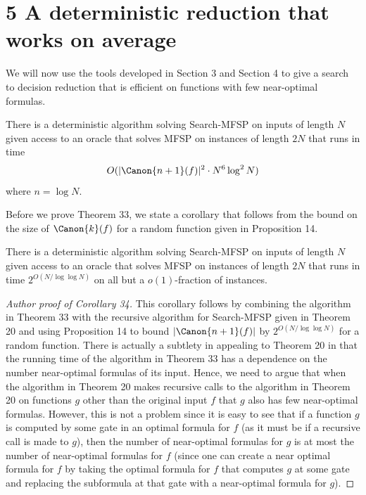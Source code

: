 \section*{5 A deterministic reduction that works on average}
We will now use the tools developed in Section 3 and Section 4 to give a search to decision reduction that is efficient on functions with few near-optimal formulas.
\setcounter{nttheorem}{32}
\begin{nttheorem}
There is a deterministic algorithm solving Search-MFSP on inputs of length $N$ given access to an oracle that solves MFSP on instances of length $2N$ that runs in time
\[O(|\Canon{n+1}(f)|^2\cdot N^6\log^2N)\]
where $n=\log N$.
\end{nttheorem}
Before we prove Theorem 33, we state a corollary that follows from the bound on the size of $\Canon{k}(f)$ for a random function given in Proposition 14.
\begin{ntcorollary}
There is a deterministic algorithm solving Search-MFSP on inputs of length $N$ given access to an oracle that solves MFSP on instances of length $2N$ that runs in time $2^{O(N/\log\log N)}$ on all but a $o(1)$-fraction of instances.
\end{ntcorollary}
\begin{proof}[Author proof of Corollary 34]
This corollary follows by combining the algorithm in Theorem 33 with the recursive algorithm for Search-MFSP given in Theorem 20 and using Proposition 14 to bound $|\Canon{n+1}(f)|$ by $2^{O(N/\log\log N)}$ for a random function.
There is actually a subtlety in appealing to Theorem 20 in that the running time of the algorithm in Theorem 33 has a dependence on the number near-optimal formulas of its input. Hence, we need to argue that when the algorithm in Theorem 20 makes recursive calls to the algorithm in Theorem 20 on functions $g$ other than the original input $f$ that $g$ also has few near-optimal formulas. However, this is not a problem since it is easy to see that if a function $g$ is computed by some gate in an optimal formula for $f$ (as it must be if a recursive call is made to $g$), then the number of near-optimal formulas for $g$ is at most the number of near-optimal formulas for $f$ (since one can create a near optimal formula for $f$ by taking the optimal formula for $f$ that computes $g$ at some gate and replacing the subformula at that gate with a near-optimal formula for $g$).
\end{proof}
